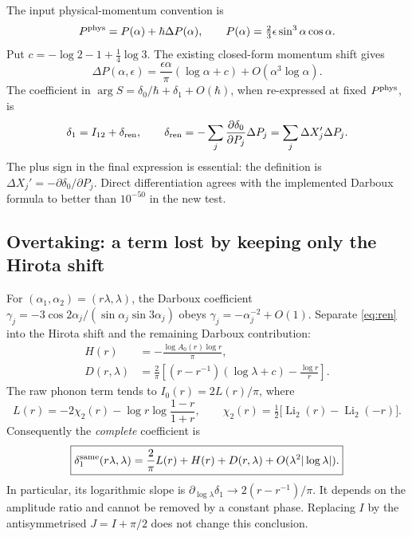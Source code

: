 \documentclass[11pt,a4paper]{article}
\newcommand{\Li}{\operatorname{Li}}
\begin{document}
The input physical-momentum convention is
\[
 P^{\rm phys}=P(\alpha)+\hbar\Delta P(\alpha),\qquad
 P(\alpha)=\tfrac23\epsilon\sin^3\alpha\cos\alpha.
\]
Put $c=-\log2-1+\tfrac14\log3$. The existing closed-form momentum shift gives
\begin{equation}
 \Delta P(\alpha,\epsilon)
 =\frac{\epsilon\alpha}{\pi}(\log\alpha+c)
 +O(\alpha^3\log\alpha).\label{eq:dp}
\end{equation}
The coefficient in $\arg S=\delta_0/\hbar+\delta_1+O(\hbar)$, when re-expressed
at fixed $P^{\rm phys}$, is
\begin{equation}
 \delta_1=I_{12}+\delta_{\rm ren},\qquad
 \delta_{\rm ren}=-\sum_j\frac{\partial\delta_0}{\partial P_j}\Delta P_j
 =\sum_j\Delta X_j'\Delta P_j.\label{eq:ren}
\end{equation}
The plus sign in the final expression is essential: the definition is
$\Delta X_j'=-\partial\delta_0/\partial P_j$.
Direct differentiation agrees with the implemented Darboux formula to
better than $10^{-50}$ in the new test.

\subsection{Overtaking: a term lost by keeping only the Hirota shift}
For $(\alpha_1,\alpha_2)=(r\lambda,\lambda)$, the Darboux coefficient
$\gamma_j=-3\cos2\alpha_j/(\sin\alpha_j\sin3\alpha_j)$ obeys
$\gamma_j=-\alpha_j^{-2}+O(1)$. Separate \eqref{eq:ren} into the Hirota
shift and the remaining Darboux contribution:
\begin{align}
 H(r)&=-\frac{\log A_0(r)\log r}{\pi},\label{eq:hirota}\\
 D(r,\lambda)&=\frac2\pi\left[
 (r-r^{-1})(\log\lambda+c)-\frac{\log r}{r}\right].\label{eq:darboux}
\end{align}
The raw phonon term tends to $I_0(r)=2L(r)/\pi$, where
\[
 L(r)=-2\chi_2(r)-\log r\log\frac{1-r}{1+r},\qquad
 \chi_2(r)=\tfrac12\big[\Li_2(r)-\Li_2(-r)\big].
\]
Consequently the \emph{complete} coefficient is
\begin{equation}
 \boxed{\delta_1^{\rm same}(r\lambda,\lambda)
 =\frac2\pi L(r)+H(r)+D(r,\lambda)
 +O(\lambda^2|\log\lambda|).}\label{eq:samefull}
\end{equation}
In particular, its logarithmic slope is
$\partial_{\log\lambda}\delta_1\to2(r-r^{-1})/\pi$.
It depends on the amplitude ratio and cannot be removed by a constant phase.
Replacing $I$ by the antisymmetrised $J=I+\pi/2$ does not change this conclusion.
\end{document}
